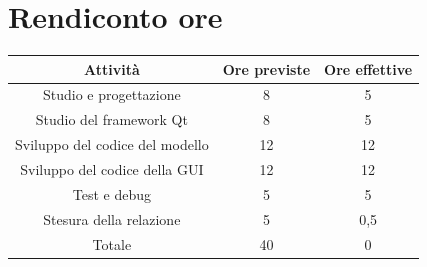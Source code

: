 \documentclass[10pt]{article}
\begin{document}
\section{Rendiconto ore}

\begin{center}
    \begin{tabular}{| c | c | c |} \hline
    Attività & Ore previste & Ore effettive \\\hline
    Studio e progettazione & 8 & 5 \\
    Studio del framework Qt & 8 & 5 \\
    Sviluppo del codice del modello & 12 & 12 \\
    Sviluppo del codice della GUI & 12 & 12 \\
    Test e debug & 5 & 5 \\
    Stesura della relazione & 5 & 0,5 \\\hline
    Totale & 40 & 0 \\\hline
    \end{tabular}
\end{center}
\end{document}
